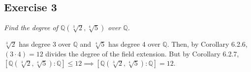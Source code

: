 \subsection*{Exercise 3}
\textit{Find the degree of $\mathbb{Q}(\sqrt[3]{2},\sqrt[4]{5})$ over $\mathbb{Q}$.}

\vspace{5 mm}
$\sqrt[3]{2}$ has degree 3 over $\mathbb{Q}$ and $\sqrt[4]{5}$ has degree 4 over $\mathbb{Q}$. Then, by Corollary 6.2.6, $(3 \cdot 4) = 12$ divides the degree of the field extension. But by Corollary 6.2.7, $[\mathbb{Q}(\sqrt[3]{2},\sqrt[4]{5}): \mathbb{Q}] \le 12 \implies [\mathbb{Q}(\sqrt[3]{2},\sqrt[4]{5}): \mathbb{Q}] = 12$.